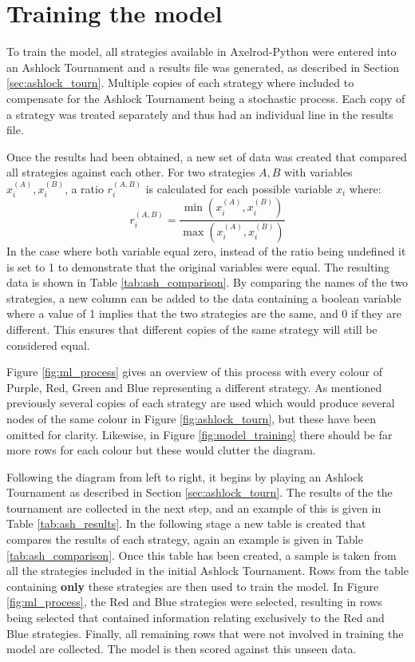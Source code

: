 \section{Training the model}\label{sec:training_model}

To train the model, all strategies available in Axelrod-Python were entered into an Ashlock Tournament and a results file was generated, as described in Section \ref{sec:ashlock_tourn}.
Multiple copies of each strategy where included to compensate for the Ashlock Tournament being a stochastic process.
Each copy of a strategy was treated separately and thus had an individual line in the results file.

Once the results had been obtained, a new set of data was created that compared all strategies against each other.
For two strategies $A, B$ with variables $x_i^{(A)}, x_i^{(B)}$, a ratio $r_i^{(A, B)}$ is calculated for each possible variable $x_i$ where:
$$
r_i^{(A, B)} = \frac{\min(x_i^{(A)}, x_i^{(B)})}{\max(x_i^{(A)}, x_i^{(B)})}
$$
In the case where both variable equal zero, instead of the ratio being undefined it is set to 1 to demonstrate that the original variables were equal.
The resulting data is shown in Table \ref{tab:ash_comparison}.
By comparing the names of the two strategies, a new column can be added to the data containing a boolean variable where a value of 1 implies that the two strategies are the same, and 0 if they are different.
This ensures that different copies of the same strategy will still be considered equal.

Figure \ref{fig:ml_process} gives an overview of this process with every colour of \textcolor{sol-violet}{Purple}, \textcolor{sol-red}{Red}, \textcolor{sol-green}{Green} and \textcolor{sol-blue}{Blue} representing a different strategy.
As mentioned previously several copies of each strategy are used which would produce several nodes of the same colour in Figure \ref{fig:ashlock_tourn}, but these have been omitted for clarity.
Likewise, in Figure \ref{fig:model_training} there should be far more rows for each colour but these would clutter the diagram.

Following the diagram from left to right, it begins by playing an Ashlock Tournament as described in Section \ref{sec:ashlock_tourn}.
The results of the the tournament are collected in the next step, and an example of this is given in Table \ref{tab:ash_results}.
In the following stage a new table is created that compares the results of each strategy, again an example is given in Table \ref{tab:ash_comparison}.
Once this table has been created, a sample is taken from all the strategies included in the initial Ashlock Tournament.
Rows from the table containing \textbf{only} these strategies are then used to train the model.
In Figure \ref{fig:ml_process}, the \textcolor{sol-red}{Red} and \textcolor{sol-blue}{Blue} strategies were selected, resulting in rows being selected that contained information relating exclusively to the \textcolor{sol-red}{Red} and \textcolor{sol-blue}{Blue} strategies.
Finally, all remaining rows that were not involved in training the model are collected.
The model is then scored against this unseen data.

